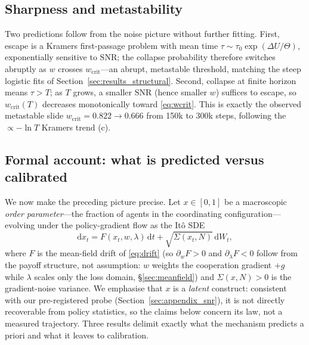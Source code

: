 \documentclass[letterpaper]{article}
\theoremstyle{plain}
\newcommand{\wcrit}{w_{\mathrm{crit}}}
\begin{document}
\subsection{Sharpness and metastability}
Two predictions follow from the noise picture without further fitting.
First, escape is a Kramers first-passage problem with mean time
$\tau\sim\tau_0\exp(\Delta U/\Theta)$, exponentially sensitive to
$\mathrm{SNR}$; the collapse probability therefore switches abruptly as $w$
crosses $\wcrit$---an abrupt, metastable threshold, matching the steep logistic
fits of Section~\ref{sec:results_structural}. Second, collapse at finite horizon
means $\tau>T$; as $T$ grows, a smaller $\mathrm{SNR}$ (hence smaller $w$)
suffices to escape, so $\wcrit(T)$ decreases monotonically toward
\eqref{eq:wcrit}. This is exactly the observed metastable slide
$\wcrit=0.822\!\to\!0.666$ from 150k to 300k steps, following the
$\propto-\ln T$ Kramers trend (c).

\subsection{Formal account: what is predicted versus calibrated}
\label{sec:meanfield_theorems}
We now make the preceding picture precise. Let $x\in[0,1]$ be a macroscopic
\emph{order parameter}---the fraction of agents in the coordinating
configuration---evolving under the policy-gradient flow as the It\^o SDE
\begin{equation}
  \mathrm{d}x_t = F(x_t,w,\lambda)\,\mathrm{d}t
    + \sqrt{\Sigma(x_t,N)}\,\mathrm{d}W_t,
  \label{eq:sde}
\end{equation}
where $F$ is the mean-field drift of \eqref{eq:drift} (so $\partial_w F>0$ and
$\partial_\lambda F<0$ follow from the payoff structure, not assumption: $w$
weights the cooperation gradient $+g$ while $\lambda$ scales only the loss
domain, \S\ref{sec:meanfield}) and $\Sigma(x,N)>0$ is the gradient-noise
variance. We emphasise that $x$ is a \emph{latent} construct: consistent with
our pre-registered probe (Section~\ref{sec:appendix_snr}), it is not directly
recoverable from policy statistics, so the claims below concern its law, not a
measured trajectory. Three results delimit exactly what the mechanism predicts
a priori and what it leaves to calibration.
\end{document}
